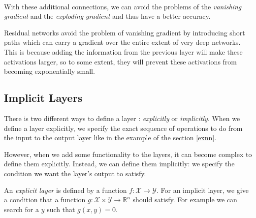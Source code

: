 \documentclass[10pt,a4paper]{article}
\theoremstyle{definition}
\theoremstyle{definition}
\theoremstyle{definition}
\begin{document}
~

With these additional connections, we can avoid the problems of the \textit{vanishing gradient} and the \textit{exploding gradient} and thus have a better accuracy. 



Residual networks avoid the problem of vanishing gradient by introducing short paths which can carry a gradient over the entire extent of very deep networks. This is because adding the information from the previous layer will make these activations larger, so to some extent, they will prevent these activations from becoming exponentially small.


\subsection{Implicit Layers}

There is two different ways to define a layer : \textit{explicitly} or \textit{implicitly}. When we define a layer explicitly, we specify the exact sequence of operations to do from the input to the output layer like in the example of the section \ref{exnn}. 

However, when we add some functionality to the layers, it can become complex to define them explicitly. Instead, we can define them implicitly: we specify the condition we want the layer's output to satisfy. 

An \textit{explicit layer} is defined by a function $f : \mathcal{X} \rightarrow \mathcal{Y}$. For an implicit layer, we give a condition that a function $g: \mathcal{X} \times \mathcal{Y} \rightarrow \mathbb{R}^n$ should satisfy. For example we can search for a $y$ such that $g(x,y) = 0$.
\end{document}
